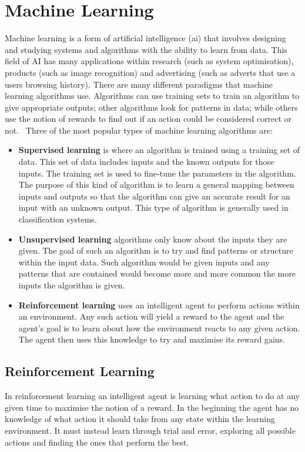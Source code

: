 \chapter{Machine Learning}\label{machine learning}
Machine learning is a form of artificial intelligence (\ac{ai}) that involves designing and studying systems and algorithms with the ability to learn from data. This field of AI has many applications within research (such as system optimisation), products (such as image recognition) and advertising (such as adverts that use a users browsing history). There are many different paradigms that machine learning algorithms use. Algorithms can use training sets to train an algorithm to give appropriate outputs; other algorithms look for patterns in data; while others use the notion of rewards to find out if an action could be considered correct or not.~\cite{alpaydin2010introduction} Three of the most popular types of machine learning algorithms are:

\begin{itemize}
  \item \textbf{Supervised learning} is where an algorithm is trained using a training set of data. This set of data includes inputs and the known outputs for those inputs. The training set is used to fine-tune the parameters in the algorithm. The purpose of this kind of algorithm is to learn a general mapping between inputs and outputs so that the algorithm can give an accurate result for an input with an unknown output. This type of algorithm is generally used in classification systems.  
  \item \textbf{Unsupervised learning} algorithms only know about the inputs they are given. The goal of such an algorithm is to try and find patterns or structure within the input data. Such algorithm would be given inputs and any patterns that are contained would become more and more common the more inputs the algorithm is given.
  \item \textbf{Reinforcement learning} uses an intelligent agent to perform actions within an environment. Any such action will yield a reward to the agent and the agent’s goal is to learn about how the environment reacts to any given action. The agent then uses this knowledge to try and maximise its reward gains.
\end{itemize}
\section{Reinforcement Learning}\label{reinforcement learning}
In reinforcement learning an intelligent agent is learning what action to do at any given time to maximise the notion of a reward. In the beginning the agent has no knowledge of what action it should take from any state within the learning environment. It must instead learn through trial and error, exploring all possible actions and finding the ones that perform the best.

